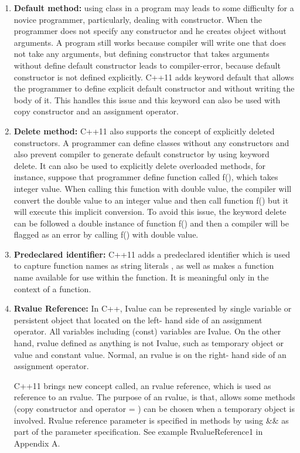 \documentclass[12pt]{report}
\begin{document}
\begin{enumerate}
\item \textbf{Default method:} using class in a program may leads to some difficulty for a novice programmer, particularly, dealing with constructor. When the programmer does not specify any constructor and he creates object without arguments. A program still works because compiler will write one that does not take any arguments, but defining constructor that takes arguments without define default constructor leads to compiler-error, because default constructor is not defined explicitly. C++11 adds keyword default that allows the programmer to define explicit default constructor and without writing the body of it. This handles this issue and this keyword can also be used with copy constructor and an assignment operator\cite{Gregorie:professionalcpp}. 

\item \textbf{Delete method:} C++11 also supports the concept of explicitly deleted constructors.  A programmer can define classes without any constructors and also prevent compiler to generate default constructor by using keyword delete.  It can also be used to explicitly delete overloaded methods, for instance, suppose that programmer define function called f(), which takes integer value. When calling this function with double value, the compiler will convert the double value to an integer value and then call function f() but it will execute this implicit conversion. To avoid this issue, the keyword delete can be followed a double instance of function f() and then a compiler will be flagged as an error by calling f() with double value\cite{Gregorie:professionalcpp}.
  
\item \textbf{Predeclared identifier:} C++11 adds a predeclared identifier which is used to capture function names as string literals , as well as makes a function name available for use within the function. It is meaningful only in the context of a function\cite{Gregorie:professionalcpp}.

\item \textbf{Rvalue Reference:} In C++, Ivalue can be represented by single variable or persistent object that located on the left- hand side of an   assignment operator. All variables including (const) variables are Ivalue. On the other hand, rvalue defined as anything is not Ivalue, such as temporary object or value and constant value. Normal, an rvalue is on the right- hand side of an assignment operator. 

C++11 brings new concept called, an rvalue reference, which is used as reference to an rvalue. The purpose of an rvalue, is that, allows some methods (copy constructor and operator = ) can be chosen when a temporary object is involved. Rvalue reference parameter is specified in methods by using \&\& as part of the parameter specification\cite{Gregorie:professionalcpp}. See example RvalueReference1 in Appendix A. 
\end{enumerate}
 
\end{document}
